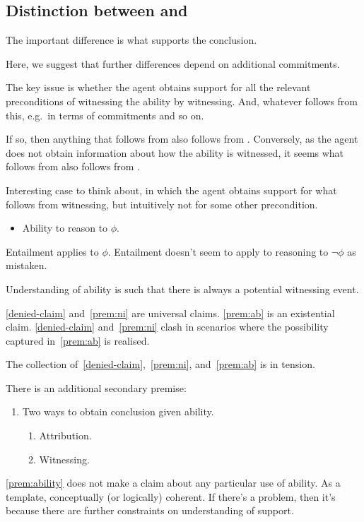 \subsection{Distinction between \AR{} and \WR{}}
\label{sec:dist-betw-ar}

\begin{note}[Overview]
  The important difference is what supports the conclusion.

  Here, we suggest that further differences depend on additional commitments.
\end{note}


\begin{note}
  The key issue is whether the agent obtains support for all the relevant preconditions of witnessing the ability by witnessing.
  And, whatever follows from this, e.g.\ in terms of commitments and so on.

  If so, then anything that follows from \AR{} also follows from \WR{}.
  Conversely, as the agent does not obtain information about how the ability is witnessed, it seems what follows from \WR{} also follows from \AR{}.
\end{note}

\begin{note}
  Interesting case to think about, in which the agent obtains support for what follows from witnessing, but intuitively not for some other precondition.
  \begin{itemize}
  \item Ability to reason to \(\phi\).
  \end{itemize}
  Entailment applies to \(\phi\).
  Entailment doesn't seem to apply to reasoning to \(\lnot\phi\) as mistaken.
\end{note}

Understanding of ability is such that there is always a potential witnessing event.

\ref{denied-claim} and~\ref{prem:ni} are universal claims.
\ref{prem:ab} is an existential claim.
\ref{denied-claim} and~\ref{prem:ni} clash in scenarios where the possibility captured in~\ref{prem:ab} is realised.

The collection of~\ref{denied-claim},~\ref{prem:ni}, and~\ref{prem:ab} is in tension.

There is an additional secondary premise:

\begin{note}
\begin{enumerate}
\item\label{prem:ability} Two ways to obtain conclusion given ability.
  \begin{enumerate}
  \item Attribution.
  \item Witnessing.
  \end{enumerate}
\end{enumerate}

\ref{prem:ability} does not make a claim about any particular use of ability.
As a template, conceptually (or logically) coherent.
If there's a problem, then it's because there are further constraints on understanding of support.
\end{note}

